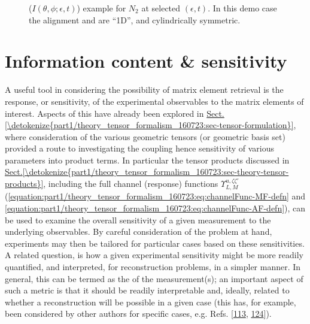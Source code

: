 \documentclass[letterpaper,table,10pt,english]{jupyterBook}
\begin{document}
\begin{figure}[htbp]
\centering
\capstart

\noindent{}
\caption{{\hyperref[\detokenize{backmatter/glossary:term-AF}]{}} (\(I(\theta,\phi;\epsilon,t)\)) example for \(N_2\) at selected \((\epsilon,t)\). In this demo case the alignment and {\hyperref[\detokenize{backmatter/glossary:term-PADs}]{}} are “1D”, and cylindrically symmetric.}\label{\detokenize{part1/theory_observables_intro_100723:fig-n2afpadsdemo}}\end{figure}

\sphinxstepscope


\section{Information content \& sensitivity}
\label{\detokenize{part1/theory_info_content_200723:information-content-sensitivity}}\label{\detokenize{part1/theory_info_content_200723:sec-info-content}}\label{\detokenize{part1/theory_info_content_200723::doc}}
\sphinxAtStartPar
A useful tool in considering the possibility of matrix element retrieval is the response, or sensitivity, of the experimental observables to the matrix elements of interest. Aspects of this have already been explored in \hyperref[\detokenize{part1/theory_tensor_formalism_160723:sec-tensor-formulation}]{Sect.\@ \ref{\detokenize{part1/theory_tensor_formalism_160723:sec-tensor-formulation}}}, where consideration of the various geometric tensors (or geometric basis set) provided a route to investigating the coupling \sphinxhyphen{} hence sensitivity \sphinxhyphen{} of various parameters into product terms. In particular the tensor products discussed in \hyperref[\detokenize{part1/theory_tensor_formalism_160723:sec-theory-tensor-products}]{Sect.\@ \ref{\detokenize{part1/theory_tensor_formalism_160723:sec-theory-tensor-products}}}, including the full channel (response) functions \(\varUpsilon_{L,M}^{u,\zeta\zeta'}\) (\eqref{equation:part1/theory_tensor_formalism_160723:eq:channelFunc-MF-defn} and \eqref{equation:part1/theory_tensor_formalism_160723:eq:channelFunc-AF-defn}), can be used to examine the overall sensitivity of a given measurement to the underlying observables. By careful consideration of the problem at hand, experiments may then be tailored for particular cases based on these sensitivities. A related question, is how a given experimental sensitivity might be more readily quantified, and interpreted, for reconstruction problems, in a simpler manner. In general, this can be termed as the  of the measurement(s); an important aspect of such a metric is that it should be readily interpretable and, ideally, related to whether a reconstruction will be possible in a given case (this has, for example, been considered by other authors for specific cases, e.g. Refs. {[}\hyperlink{cite.backmatter/bibliography:id835}{113}, \hyperlink{cite.backmatter/bibliography:id870}{124}{]}).
\end{document}
